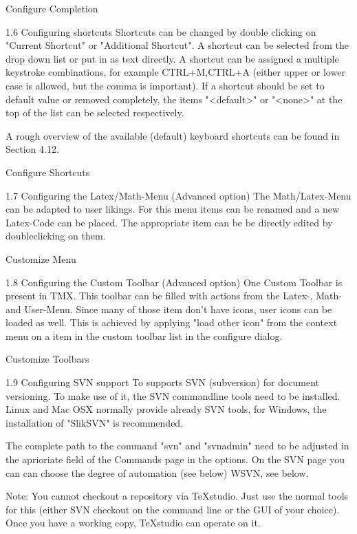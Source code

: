 \documentclass{article}
\begin{document}
	Configure Completion
	
	1.6 Configuring shortcuts
	Shortcuts can be changed by double clicking on "Current Shortcut" or "Additional Shortcut". A shortcut can be selected from the drop down list or put in as text directly. A shortcut can be assigned a multiple keystroke combinations, for example CTRL+M,CTRL+A (either upper or lower case is allowed, but the comma is important). If a shortcut should be set to default value or removed completely, the items "<default>" or "<none>" at the top of the list can be selected respectively.
	
	A rough overview of the available (default) keyboard shortcuts can be found in Section 4.12.
	
	Configure Shortcuts
	
	1.7 Configuring the Latex/Math-Menu (Advanced option)
	The Math/Latex-Menu can be adapted to user likings. For this menu items can be renamed and a new Latex-Code can be placed. The appropriate item can be be directly edited by doubleclicking on them.
	
	Customize Menu
	
	1.8 Configuring the Custom Toolbar (Advanced option)
	One Custom Toolbar is present in TMX. This toolbar can be filled with actions from the Latex-, Math- and User-Menu. Since many of those item don't have icons, user icons can be loaded as well. This is achieved by applying "load other icon" from the context menu on a item in the custom toolbar list in the configure dialog.
	
	Customize Toolbars
	
	1.9 Configuring SVN support
	To supports SVN (subversion) for document versioning. To make use of it, the SVN commandline tools need to be installed. Linux and Mac OSX normally provide already SVN tools, for Windows, the installation of "SlikSVN" is recommended.
	
	The complete path to the command "svn" and "svnadmin" need to be adjusted in the aprioriate field of the Commands page in the options. On the SVN page you can can choose the degree of automation (see below) WSVN, see below.
	
	Note: You cannot checkout a repository via TeXstudio. Just use the normal tools for this (either SVN checkout on the command line or the GUI of your choice). Once you have a working copy, TeXstudio can operate on it.
	
\end{document}
